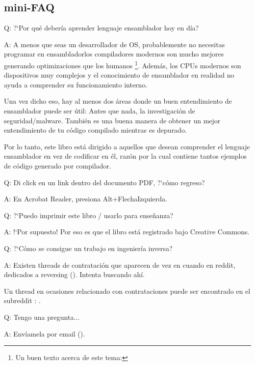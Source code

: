 \subsection*{mini-FAQ}


\par Q: ?`Por qu\'e deber\'ia aprender lenguaje ensamblador hoy en d\'ia?
\par A: A menos que seas un desarrollador de \ac{OS}, probablemente no necesitas programar en ensamblador\textemdash{}los compiladores modernos
son mucho mejores generando optimizaciones que los humanos
\footnote{Un buen texto acerca de este tema: \InSqBrackets{\AgnerFog}}.
Adem\'as, los \ac{CPU}s modernos son dispositivos muy complejos y el conocimiento de ensamblador en realidad no ayuda a comprender su funcionamiento interno.

Una vez dicho eso, hay al menos dos \'areas donde un buen entendimiento de ensamblador puede ser \'util:
Antes que nada, la investigaci\'on de seguridad/malware. Tambi\'en es una buena manera de obtener un mejor entendimiento de tu c\'odigo compilado mientras es depurado.

Por lo tanto, este libro est\'a dirigido a aquellos que desean comprender el lenguaje ensamblador en vez de codificar en \'el,
raz\'on por la cual contiene tantos ejemplos de c\'odigo generado por compilador.

\par Q: Di click en un link dentro del documento PDF, ?`c\'omo regreso?
\par A: En Acrobat Reader, presiona Alt+FlechaIzquierda.

\par Q: ?`Puedo imprimir este libro / usarlo para ense\~nanza?
\par A: !`Por supuesto! Por eso es que el libro est\'a registrado bajo Creative Commons.

\par Q: ?`C\'omo se consigue un trabajo en ingenier\'ia inversa?
\par A: Existen threads de contrataci\'on que aparecen de vez en cuando en reddit, dedicados a reversing\FNURLREDDIT{}
(\RedditHiringThread{}).
Intenta buscando ah\'i.

Un thread en ocasiones relacionado con contrataciones puede ser encontrado en el subreddit :
\NetsecHiringThread{}.


\par Q: Tengo una pregunta...
\par A: Env\'iamela por email (\EMAIL).

